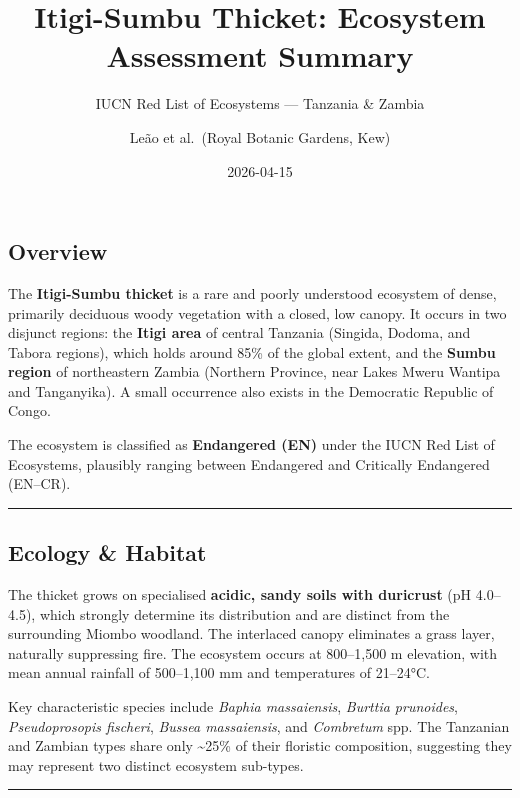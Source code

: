 \documentclass[
  11pt,
  a4paper,
  DIV=11,
  numbers=noendperiod]{scrartcl}
\title{Itigi-Sumbu Thicket: Ecosystem Assessment Summary}
\subtitle{IUCN Red List of Ecosystems --- Tanzania \& Zambia}
\author{Leão et al.~(Royal Botanic Gardens, Kew)}
\date{2026-04-15}
\begin{document}
\maketitle

\subsection{Overview}\label{overview}

The \textbf{Itigi-Sumbu thicket} is a rare and poorly understood
ecosystem of dense, primarily deciduous woody vegetation with a closed,
low canopy. It occurs in two disjunct regions: the \textbf{Itigi area}
of central Tanzania (Singida, Dodoma, and Tabora regions), which holds
around 85\% of the global extent, and the \textbf{Sumbu region} of
northeastern Zambia (Northern Province, near Lakes Mweru Wantipa and
Tanganyika). A small occurrence also exists in the Democratic Republic
of Congo.

The ecosystem is classified as \textbf{Endangered (EN)} under the IUCN
Red List of Ecosystems, plausibly ranging between Endangered and
Critically Endangered (EN--CR).

\begin{center}\rule{0.5\linewidth}{0.5pt}\end{center}

\subsection{Ecology \& Habitat}\label{ecology-habitat}

The thicket grows on specialised \textbf{acidic, sandy soils with
duricrust} (pH 4.0--4.5), which strongly determine its distribution and
are distinct from the surrounding Miombo woodland. The interlaced canopy
eliminates a grass layer, naturally suppressing fire. The ecosystem
occurs at 800--1,500 m elevation, with mean annual rainfall of
500--1,100 mm and temperatures of 21--24°C.

Key characteristic species include \emph{Baphia massaiensis},
\emph{Burttia prunoides}, \emph{Pseudoprosopis fischeri}, \emph{Bussea
massaiensis}, and \emph{Combretum} spp. The Tanzanian and Zambian types
share only \textasciitilde25\% of their floristic composition,
suggesting they may represent two distinct ecosystem sub-types.

\begin{center}\rule{0.5\linewidth}{0.5pt}\end{center}
\end{document}
